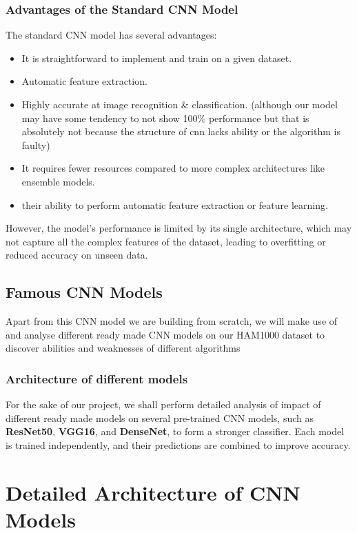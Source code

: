 \documentclass{article}
\begin{document}
\subsubsection{Advantages of the Standard CNN Model}

The standard CNN model has several advantages:
\begin{itemize}
    \item It is straightforward to implement and train on a given dataset.
    \item Automatic feature extraction.
    \item Highly accurate at image recognition & classification.
(although our model may have some tendency to not show 100\% performance but that is absolutely not because the structure of cnn lacks ability or the algorithm is faulty)
    
    \item It requires fewer resources compared to more complex architectures like ensemble models.
    \item   their ability to perform automatic feature extraction or feature learning. 
\end{itemize}

However, the model's performance is limited by its single architecture, which may not capture all the complex features of the dataset, leading to overfitting or reduced accuracy on unseen data.

\subsection{Famous CNN  Models}

Apart from this CNN model we are building from scratch, we will make  use of and analyse different ready made CNN models on our HAM1000 dataset to discover abilities and weaknesses of different algorithms
\subsubsection{Architecture of different models}

For the sake of our project, we shall perform detailed analysis of impact of different ready made models on several pre-trained CNN models, such as \textbf{ResNet50}, \textbf{VGG16}, and \textbf{DenseNet}, to form a stronger classifier. Each model is trained independently, and their predictions are combined to improve accuracy.
\section{Detailed Architecture of CNN Models}
\end{document}
